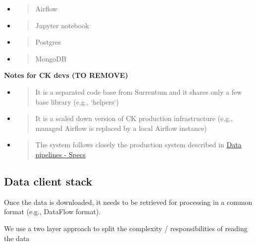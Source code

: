 \documentclass[11pt, reqno]{amsart}
\begin{document}
\begin{itemize}
\item
  \begin{quote}
  Airflow
  \end{quote}
\item
  \begin{quote}
  Jupyter notebook
  \end{quote}
\item
  \begin{quote}
  Postgres
  \end{quote}
\item
  \begin{quote}
  MongoDB
  \end{quote}
\end{itemize}

\textbf{Notes for CK devs (TO REMOVE)}

\begin{itemize}
\item
  \begin{quote}
  It is a separated code base from Surrentum and it shares only a few
  base library (e.g., `helpers`)
  \end{quote}
\item
  \begin{quote}
  It is a scaled down version of CK production infrastructure (e.g.,
  managed Airflow is replaced by a local Airflow instance)
  \end{quote}
\item
  \begin{quote}
  The system follows closely the production system described in
  \href{https://docs.google.com/document/d/1nLhaFBSHVrexCcwJMnpXlkqwn0l6bDiVer34GKVclYY/edit\#}{\ul{Data
  pipelines - Specs}}
  \end{quote}
\end{itemize}

\subsection{Data client stack}

Once the data is downloaded, it needs to be retrieved for processing in
a common format (e.g., DataFlow format).

We use a two layer approach to split the complexity / responsibilities
of reading the data
\end{document}
